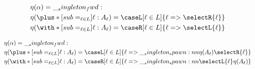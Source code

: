 


\section{}

\begin{equation*}
  \begin{lgathered}
    \eta(\alpha) = \fwd \\
    \eta(\plus*[sub=_{\ell \in L}]{\ell:A_{\ell}}) = \caseL[\ell \in L]{\ell => \selectR{\ell}} \\
    \eta(\with*[sub=_{\ell \in L}]{\ell:A_{\ell}}) = \caseR[\ell \in L]{\ell => \selectL{\ell}}
  \end{lgathered}
\end{equation*}

\begin{equation*}
  \begin{lgathered}
    \eta(\alpha) = \fwd \\
    \eta(\plus*[sub=_{\ell \in L}]{\ell:A_{\ell}}) = \caseL[\ell \in L]{\ell => \spawn{\eta(A_{\ell})}{\selectR{\ell}}} \\
    \eta(\with*[sub=_{\ell \in L}]{\ell:A_{\ell}}) = \caseR[\ell \in L]{\ell => \spawn{\selectL{\ell}}{\eta(A_{\ell})}}
  \end{lgathered}
\end{equation*}

